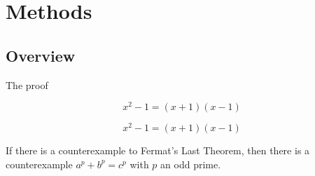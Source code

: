 \chapter{Methods}

\section{Overview}
The proof

\begin{lemma} $$ x^2-1=(x+1)(x-1) $$ \label{lem:format} \end{lemma}

\begin{theorem} $$ x^2-1=(x+1)(x-1) $$ \label{lem:format1} \end{theorem}

\begin{lemma}\label{FermatLastTheorem.of_odd_primes}\leanok
  If there is a counterexample to Fermat's Last Theorem, then there is a counterexample $a^p+b^p=c^p$
  with $p$ an odd prime.
\end{lemma}